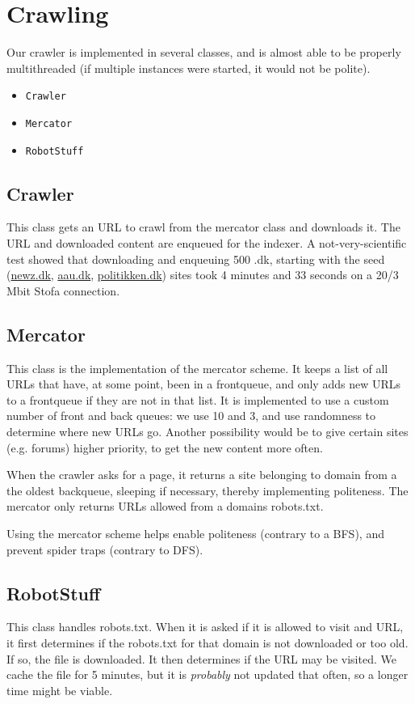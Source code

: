 \section{Crawling}
Our crawler is implemented in several classes, and is almost able to be properly multithreaded (if multiple instances were started, it would not be polite).
\begin{itemize}
	\item \texttt{Crawler}
	\item \texttt{Mercator}
	\item \texttt{RobotStuff}
\end{itemize}

\subsection{Crawler}
This class gets an URL to crawl from the mercator class and downloads it. The URL and downloaded content are enqueued for the indexer. A not-very-scientific test showed that downloading and enqueuing 500 .dk, starting with the seed (\url{newz.dk}, \url{aau.dk}, \url{politikken.dk}) sites took 4 minutes and 33 seconds on a 20/3 Mbit Stofa connection.

\subsection{Mercator}
This class is the implementation of the mercator scheme. It keeps a list of all URLs that have, at some point, been in a frontqueue, and only adds new URLs to a frontqueue if they are not in that list. It is implemented to use a custom number of front and back queues: we use 10 and 3, and use randomness to determine where new URLs go. Another possibility would be to give certain sites (e.g. forums) higher priority, to get the new content more often.

When the crawler asks for a page, it returns a site belonging to domain from a the oldest backqueue, sleeping if necessary, thereby implementing politeness. The mercator only returns URLs allowed from a domains robots.txt.

Using the mercator scheme helps enable politeness (contrary to a BFS), and prevent spider traps (contrary to DFS).

\subsection{RobotStuff}
This class handles robots.txt. When it is asked if it is allowed to visit and URL, it first determines if the robots.txt for that domain is not downloaded or too old. If so, the file is downloaded. It then determines if the URL may be visited. We cache the file for 5 minutes, but it is \emph{probably} not updated that often, so a longer time might be viable.